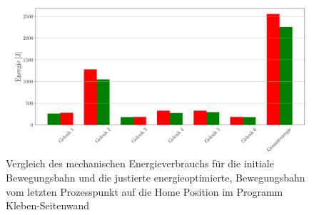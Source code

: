 \begin{figure}[tbph]
	\centering
	\includegraphics[width=1\linewidth]{images/e_up500}
	\caption{Vergleich des mechanischen Energieverbrauchs für die initiale Bewegungsbahn und die justierte energieoptimierte, Bewegungsbahn vom letzten Prozesspunkt auf die  Home Position im Programm Kleben-Seitenwand}
	\label{fig:eup500}        
\end{figure}
